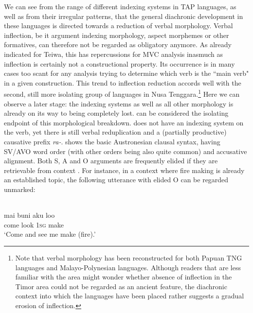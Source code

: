 We can see from the range of different indexing systems in TAP languages, as well as from their irregular patterns, that the general diachronic development in these languages is directed towards a reduction of verbal morphology. Verbal inflection, be it argument indexing morphology, aspect morphemes or other formatives, can therefore not be regarded as obligatory anymore. As already indicated for Teiwa, this has repercussions for MVC analysis inasmuch as inflection is certainly not a constructional property. Its occurrence is in many cases too scant for any analysis trying to determine which verb is the ``main verb" in a given construction. This trend to inflection reduction accords well with the second, still more isolating group of languages in Nusa Tenggara.\footnote{Note that verbal morphology has been reconstructed for both Papuan TNG languages and Malayo-Polynesian languages. Although readers that are less familiar with the area might wonder whether absence of inflection in the Timor area could not be regarded as an ancient feature, the diachronic context into which the languages have been placed rather suggests a gradual erosion of inflection.} Here we can observe a later stage: the indexing systems as well as all other morphology is already on its way to being completely lost.  can be considered the isolating endpoint of this morphological breakdown.  does not have an indexing system on the verb, yet there is still verbal reduplication and a (partially productive) causative prefix \textit{ra-}.  shows the basic Austronesian clausal syntax, having SV/AVO word order (with other orders being also quite common) and accusative alignment. Both S, A and O arguments are frequently elided if they are retrievable from context \citep{bowden2006}. For instance, in a context where fire making is already an established topic, the following utterance with elided O can be regarded unmarked:

\ea 
{}\\
\gll mai buni aku loo \\
come look \textsc{1}\textsc{sg} make \\
\glft ‘Come and see me make (fire).’
\z

